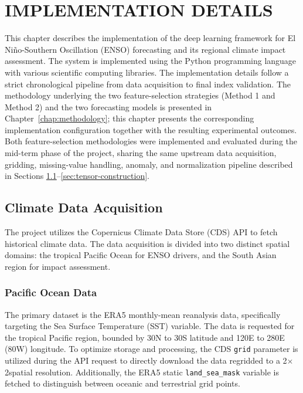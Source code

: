 \chapter{IMPLEMENTATION DETAILS}
\label{chap:implementation}

This chapter describes the implementation of the deep learning framework for El Ni\~{n}o-Southern Oscillation (ENSO) forecasting and its regional climate impact assessment. The system is implemented using the Python programming language with various scientific computing libraries. The implementation details follow a strict chronological pipeline from data acquisition to final index validation. The methodology underlying the two feature-selection strategies (Method 1 and Method 2) and the two forecasting models is presented in Chapter~\ref{chap:methodology}; this chapter presents the corresponding implementation configuration together with the resulting experimental outcomes. Both feature-selection methodologies were implemented and evaluated during the mid-term phase of the project, sharing the same upstream data acquisition, gridding, missing-value handling, anomaly, and normalization pipeline described in Sections \ref{sec:climate-data}--\ref{sec:tensor-construction}.

\section{Climate Data Acquisition}
\label{sec:climate-data}

The project utilizes the Copernicus Climate Data Store (CDS) API to fetch historical climate data. The data acquisition is divided into two distinct spatial domains: the tropical Pacific Ocean for ENSO drivers, and the South Asian region for impact assessment.

\subsection{Pacific Ocean Data}

The primary dataset is the ERA5 monthly-mean reanalysis data, specifically targeting the Sea Surface Temperature (SST) variable. The data is requested for the tropical Pacific region, bounded by 30\degree N to 30\degree S latitude and 120\degree E to 280\degree E (80\degree W) longitude. To optimize storage and processing, the CDS \texttt{grid} parameter is utilized during the API request to directly download the data regridded to a 2\degree $\times$ 2\degree spatial resolution. Additionally, the ERA5 static \texttt{land\_sea\_mask} variable is fetched to distinguish between oceanic and terrestrial grid points.


